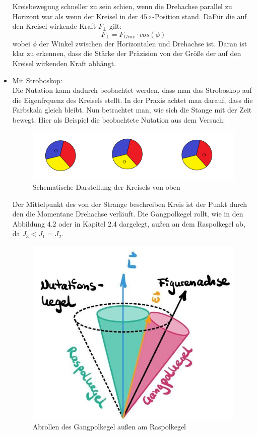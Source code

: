 \begin{itemize}
        Kreisbewegung schneller zu sein schien, wenn die Drehachse parallel zu Horizont war als wenn der Kreisel in der $45\circ$-Position stand. DaFür die auf den 
        Kreisel wirkende Kraft $F_{\bot}$ gilt:
    \begin{equation*}
        F_{\bot} = F_{Grav} \cdot cos(\phi)
    \end{equation*}
    wobei $\phi$ der Winkel zwischen der Horizontalen und Drehachse ist.
    Daran ist klar zu erkennen, dass die Stärke der Präzision von der Größe der auf den Kreisel wirkenden Kraft abhängt.
    \item Mit Stroboskop:\\
        Die Nutation kann dadurch beobachtet werden, dass man das Stroboskop auf die Eigenfrquenz des Kreisels stellt. In der Praxis achtet man darauf, dass die Farbskala gleich bleibt. Nun betrachtet man, wie sich 
        die Stange mit der Zeit bewegt. Hier als Beispiel die beobachtete Nutation aus dem Versuch:\\
        \begin{figure}[h]
            \centering
            \includegraphics[width = 13cm]{Bilder/Leo/Nutationfarben.png}
            \caption{Schematische Darstellung der Kreisels von oben}
        \end{figure}
        Der Mittelpunkt des von der Strange beschreiben Kreis ist der Punkt durch den die Momentane Drehachse verläuft.
        Die Gangpolkegel rollt, wie in den Abbildung 4.2 oder in Kapitel 2.4
        dargelegt, außen an dem Raspolkegel ab, da $J_3 < J_1 = J_2$.
        \begin{figure}[h]
            \centering
            \includegraphics[scale = 0.3]{Bilder/6_1-Nutationsbewegung.jpg}
            \caption{Abrollen des Gangpolkegel außen am Raspolkegel}
        \end{figure}

\end{itemize}
